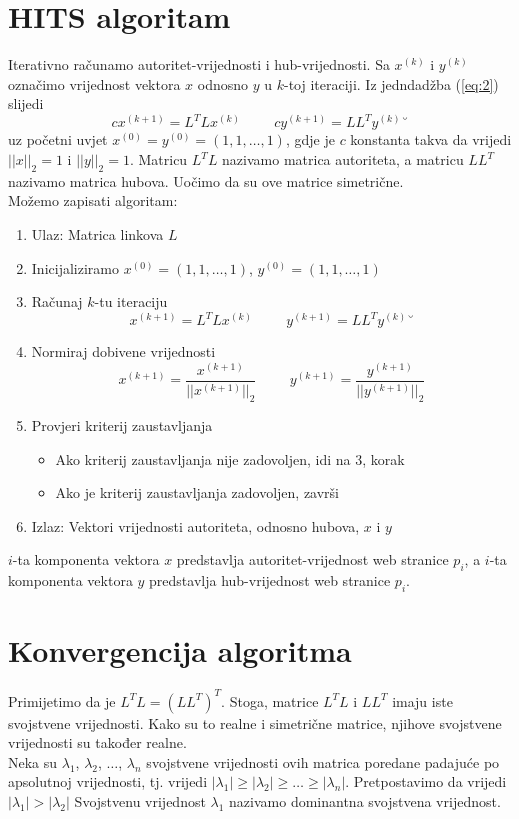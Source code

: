 \documentclass[11pt]{article}
\begin{document}
\section{HITS algoritam}
Iterativno računamo autoritet-vrijednosti i hub-vrijednosti.
Sa $x^{(k)}$ i $y^{(k)}$ označimo vrijednost vektora $x$ odnosno $y$ u $k$-toj iteraciji. Iz jedndadžba (\ref{eq:2}) slijedi
\begin{equation}
cx^{(k+1)} = L^{T}Lx^{(k)}\hspace{1cm} cy^{(k+1)} = LL^{T}y^{(k)}˘
\end{equation}
uz početni uvjet
$x^{(0)} = y^{(0)} = (1, 1, \dots, 1)$, gdje je $c$ konstanta takva da vrijedi $||x||_{2} =1$ i $||y||_{2} =1$. Matricu $L^{T}L$ nazivamo matrica autoriteta, a matricu $LL^{T}$ nazivamo matrica hubova. Uočimo da su ove matrice simetrične.\\
Možemo zapisati algoritam:
\begin{enumerate}
\item Ulaz: Matrica linkova $L$
\item Inicijaliziramo $x^{(0)} = (1,1,\dots,1)$, $y^{(0)} = (1,1,\dots,1)$
\item Računaj $k$-tu iteraciju 
\begin{equation*}
x^{(k+1)} = L^{T}Lx^{(k)}\hspace{1cm} y^{(k+1)} = LL^{T}y^{(k)}˘
\end{equation*}
\item Normiraj dobivene vrijednosti
\begin{equation*}
x^{(k+1)} = \frac{x^{(k+1)}}{||x^{(k+1)}||_{2}}\hspace{1cm}y^{(k+1)} = \frac{y^{(k+1)}}{||y^{(k+1)}||_{2}}
\end{equation*}
\item Provjeri kriterij zaustavljanja
\begin{itemize}
\item Ako kriterij zaustavljanja nije zadovoljen, idi na 3, korak
\item Ako je kriterij zaustavljanja zadovoljen, završi
\end{itemize}
\item Izlaz: Vektori vrijednosti autoriteta, odnosno hubova, $x$ i $y$
\end{enumerate}
$i$-ta komponenta vektora $x$ predstavlja autoritet-vrijednost web stranice $p_{i}$, a $i$-ta komponenta vektora $y$ predstavlja hub-vrijednost web stranice $p_{i}$.
\section{Konvergencija algoritma}
Primijetimo da je $L^{T}L = (LL^{T})^{T}$. Stoga, matrice $L^{T}L$ i $LL^{T}$ imaju iste svojstvene vrijednosti. Kako su to realne i simetrične matrice, njihove svojstvene vrijednosti su također realne.\\
Neka su $\lambda_{1}$, $\lambda_{2}$, $\dots$, $\lambda_{n}$ svojstvene vrijednosti ovih matrica poredane padajuće po apsolutnoj vrijednosti, tj. vrijedi $|\lambda_{1}|\geq |\lambda_{2}|\geq \dots \geq |\lambda_{n}|$. Pretpostavimo da vrijedi $|\lambda_{1}| > |\lambda_{2}|$
Svojstvenu vrijednost $\lambda_{1}$ nazivamo dominantna svojstvena vrijednost.
\end{document}
